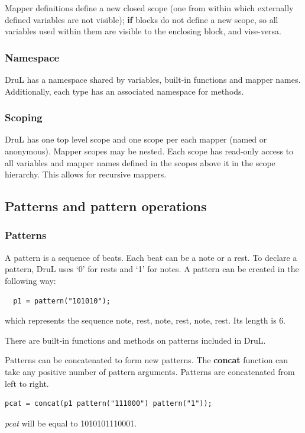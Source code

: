 \documentclass[11pt,twoside]{article}
\begin{document}
Mapper definitions define a new closed scope (one from within which externally defined variables are not visible); \textbf{if} blocks do not define a new scope, so all variables used within them are visible to the enclosing  block, and vise-versa.

\subsubsection{Namespace}

DruL has a namespace shared by variables, built-in functions and 
mapper names. Additionally, each type has an associated namespace for methods.

\subsubsection{Scoping}

DruL has one top level scope and one scope per each mapper
(named or anonymous). Mapper scopes may be nested.
Each scope has read-only access to all variables and mapper names
defined in the scopes above it in the scope hierarchy.
This allows for recursive mappers.





\subsection{Patterns and pattern operations}

\subsubsection{Patterns}

A pattern is a sequence of beats.  Each beat can be a note or a rest.
To declare a pattern, DruL uses `0' for rests and `1' for notes.
A pattern can be created in the following way:
\begin{verbatim}
  p1 = pattern("101010");
\end{verbatim}
which represents the sequence {note, rest, note, rest, note, rest}.
Its length is $6$.

There are built-in functions and methods on patterns included in DruL.

Patterns can be concatenated to form new patterns.  The \textbf{concat} function can take any positive number of pattern arguments.  Patterns are concatenated from left to right.
\begin{verbatim}
pcat = concat(p1 pattern("111000") pattern("1"));
\end{verbatim}
\textit{pcat} will be equal to 1010101110001.
\end{document}
